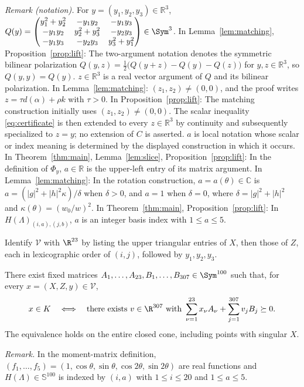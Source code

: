 \noindent\textit{Remark (notation).} For $y=(y_1,y_2,y_3)\in\mathbb R^3$, $Q(y)=\begin{pmatrix}y_1^2+y_2^2&-y_1y_2&-y_1y_3\\-y_1y_2&y_2^2+y_3^2&-y_2y_3\\-y_1y_3&-y_2y_3&y_3^2+y_1^2\end{pmatrix}\in\Sym^3$. In Lemma~\ref{lem:matching}, Proposition~\ref{prop:lift}: The two-argument notation denotes the symmetric bilinear polarization $Q(y,z)=\tfrac12\bigl(Q(y+z)-Q(y)-Q(z)\bigr)$ for $y,z\in\mathbb R^3$, so $Q(y,y)=Q(y)$. $z\in\mathbb R^3$ is a real vector argument of $Q$ and its bilinear polarization. In Lemma~\ref{lem:matching}: $(z_1,z_2)\ne(0,0)$, and the proof writes $z=\tau d(\alpha)+\rho k$ with $\tau>0$. In Proposition~\ref{prop:lift}: The matching construction initially uses $(z_1,z_2)\ne(0,0)$. The scalar inequality \eqref{eq:certificate} is then extended to every $z\in\mathbb R^3$ by continuity and subsequently specialized to $z=y$; no extension of $C$ is asserted. $a$ is local notation whose scalar or index meaning is determined by the displayed construction in which it occurs. In Theorem~\ref{thm:main}, Lemma~\ref{lem:slice}, Proposition~\ref{prop:lift}: In the definition of $\Phi_y$, $a\in\mathbb R$ is the upper-left entry of its matrix argument. In Lemma~\ref{lem:matching}: In the rotation construction, $a=a(\theta)\in\mathbb C$ is $a=(|g|^2+|h|^2\kappa)/\delta$ when $\delta>0$, and $a=1$ when $\delta=0$, where $\delta=|g|^2+|h|^2$ and $\kappa(\theta)=(w_0/w)^2$. In Theorem~\ref{thm:main}, Proposition~\ref{prop:lift}: In $H(\Lambda)_{(i,a),(j,b)}$, $a$ is an integer basis index with $1\leq a\leq5$.


Identify $\mathcal V$ with $\R^{23}$ by listing the upper triangular
entries of $X$, then those of $Z$, each in lexicographic order of
$(i,j)$, followed by $y_1,y_2,y_3$.

\begin{theorem}\label{thm:main}
There exist fixed matrices $A_1,\ldots,A_{23},B_1,\ldots,B_{307}
\in\Sym^{100}$ such that, for every $x=(X,Z,y)\in\mathcal V$,
\[
 x\in K\quad\Longleftrightarrow\quad
 \text{there exists }v\in\R^{307}\text{ with }
 \sum_{\nu=1}^{23}x_\nu A_\nu+
 \sum_{j=1}^{307}v_jB_j\succeq0.
\]
The equivalence holds on the entire closed cone, including points
with singular $X$.
\end{theorem}

\noindent\textit{Remark.} In the moment-matrix definition, $(f_1,\ldots,f_5)=(1,\cos\theta,\sin\theta,\cos2\theta,\sin2\theta)$ are real functions and $H(\Lambda)\in\mathbb S^{100}$ is indexed by $(i,a)$ with $1\leq i\leq20$ and $1\leq a\leq5$.

